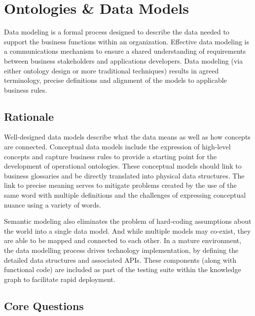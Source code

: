 \section{Ontologies \& Data Models}\label{sec:b-2-2} %


Data modeling is a formal process designed to describe the data needed to support the business functions within an organization.
Effective data modeling is a communications mechanism to ensure a shared understanding of requirements between business stakeholders and applications developers.
Data modeling (via either ontology design or more traditional techniques) results in agreed terminology, precise definitions and alignment of the models to applicable business rules.

\subsection*{ Rationale}

Well-designed data models describe what the data means as well as how concepts are connected.
Conceptual data models include the expression of high-level concepts and capture business rules to provide a starting point for the development of operational ontologies.
These conceptual models should link to business glossaries and be directly translated into physical data structures.
The link to precise meaning serves to mitigate problems created by the use of the same word with multiple definitions and the challenges of expressing conceptual nuance using a variety of words.

Semantic modeling also eliminates the problem of hard-coding assumptions about the world into a single data model.
And while multiple models may co-exist, they are able to be mapped and connected to each other.
In a mature environment, the data modelling process drives technology implementation, by defining the detailed data structures and associated APIs.
These components (along with functional code) are included as part of the testing suite within the knowledge graph to facilitate rapid deployment.

\subsection*{Core Questions}

